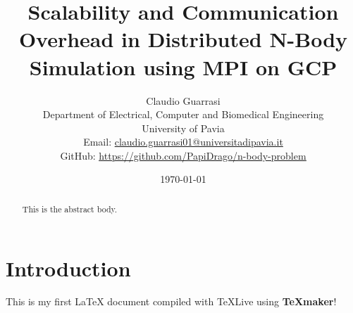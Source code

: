 \documentclass[a4paper, titlepage]{article}
\title{\textbf{Scalability and Communication Overhead in Distributed N-Body Simulation using MPI on GCP}}
\author{Claudio Guarrasi\\[1ex]
	\small{Department of Electrical, Computer and Biomedical Engineering}\\
	\small{University of Pavia}\\[1ex]
	\small{Email: \href{mailto:claudio.guarrasi01@universitadipavia.it}{claudio.guarrasi01@universitadipavia.it}}\\
	\small{GitHub: \href{https://github.com/PapiDrago/n-body-problem}{\underline{https://github.com/PapiDrago/n-body-problem}}}}
\date{\today}
\begin{document}
\begin{titlingpage}








\maketitle %

\begin{abstract}
This is the abstract body.
\end{abstract}

\end{titlingpage}

\section{Introduction}

This is my first LaTeX document compiled with \TeX Live{} using \textbf{TeXmaker}!
\end{document}
